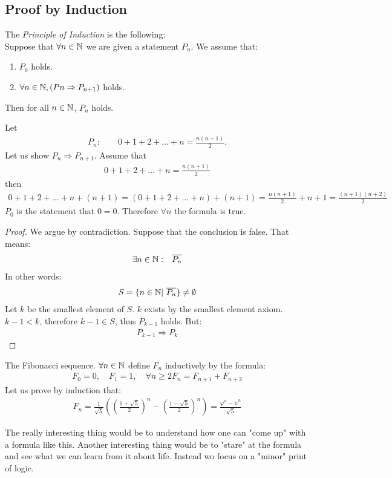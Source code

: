 \subsection{Proof by Induction}
\begin{tm}
	The \emph{Principle of Induction} is the following: \\
	Suppose that $\forall n \in \mathbb N$ we are given a statement $P_n$. We assume that:
	\begin{enumerate}
		\item 
		$P_0$ holds.
		\item
		$\forall n \in \mathbb N, (Pn \Rightarrow P_{n+1})$ holds.
	\end{enumerate}
	Then for all  $n \in \mathbb N$, $P_n$ holds.
\end{tm}
\begin{ex} Let
\begin{align*}
 P_n: \qquad 0+1+2+\dots +n = \frac{n(n+1)} 2.
\end{align*}
Let us show $P_n \Rightarrow P_{n+1}$.
Assume that 
\begin{align*}
0+1+2+\dots+n = \frac{n(n+1)} 2
\end{align*}
then
\begin{align*}
0+1+2+\dots+n +(n+1) = (0+1+2+\dots+n) +(n+1)
= \frac{n(n+1)} 2 + n+1 = \frac{(n+1)(n+2)}{2}
\end{align*}
$P_0$ is the statement that $0=0$. Therefore $\forall n$ the formula is true.
\end{ex}
\begin{proof}
We argue by contradiction. Suppose that the conclusion is false. That means:
\begin{align*}
& \exists n \in \mathbb N: & \overline{P_n}
\end{align*}
In other words:
\begin{align*}
S= \{ n \in \mathbb N| ~ \overline{P_n} \} \neq \emptyset
\end{align*}
Let $k$ be the smallest element of $S$. $k$ exists by the smallest element axiom.
$k-1 < k$, therefore $k-1 \in S$, thus $P_{k-1}$ holds. But:  
\begin{align*}
P_{k-1} \Rightarrow P_k
\end{align*}
\end{proof}
\begin{ex}
The Fibonacci sequence.
$\forall n \in \mathbb N$ define $F_n$ inductively by the formula:
\begin{align*}
F_0 = 0, \quad F_1 = 1, \quad \forall n \geq 2 F_n = F_{n+1} +F_{n+2}
\end{align*}
Let us prove by induction that:
\begin{align*}
F_n = \frac {1}{\sqrt 5} \left( \left( \frac{1+\sqrt 5} 2 \right)^n - \left( \frac{1-\sqrt 5}{2} \right)^n \right)   = \frac{\varphi^n-\psi^n}{\sqrt 5}
\end{align*}
\end{ex}
The really interesting thing would be to understand how one can "come up" with a formula like this. 
Another interesting thing would be to "stare" at the formula and see what we can learn from it about life.
Instead wo focus on a "minor" print of logic.

